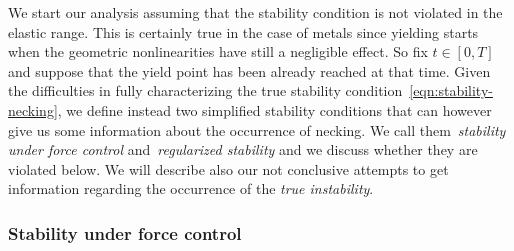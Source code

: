 \documentclass[a4paper,10pt,twoside]{amsbook}
\numberwithin{section}{chapter}
\numberwithin{equation}{chapter}
\theoremstyle{definition}
\begin{document}
We start our analysis assuming that the stability condition is not violated in the elastic range. This is certainly true in the case of metals since yielding starts when the geometric nonlinearities have still a negligible effect. So fix $t\in[0,T]$ and suppose that the yield point has been already reached at that time. Given the difficulties in fully characterizing the true stability condition~\eqref{eqn:stability-necking}, we define instead two simplified stability conditions that can however give us some information about the occurrence of necking. We call them~\emph{stability under force control} and~\emph{regularized stability} and we discuss whether they are violated below. We will describe also our not conclusive attempts to get information regarding the occurrence of the \emph{true instability}.

\subsubsection*{Stability under force control}
\end{document}
